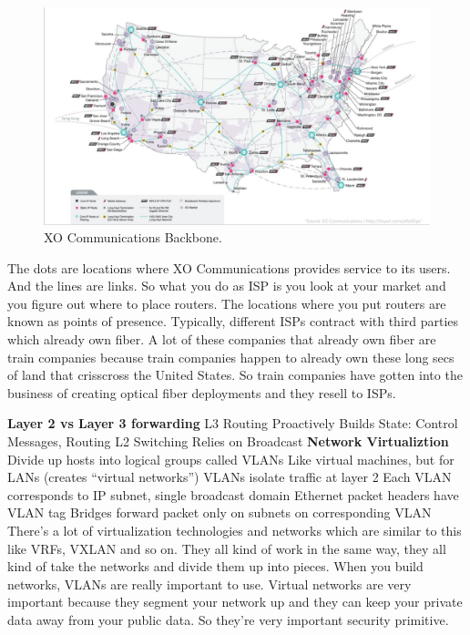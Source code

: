\documentclass[11 pt]{scrartcl}
\begin{document}
    \itemend
\itemend
\begin{figure}[!htb]
    \centering
    \includegraphics[scale=0.5]{assets/xo.png}
    \caption{XO Communications Backbone.}
\end{figure}
\begin{example}
The dots are locations where XO Communications provides service to its users. And the lines are links. So what you do as ISP is you look at your market and you figure out where to place routers. The locations where you put routers are known as points of presence. Typically, different ISPs contract with third parties which already own fiber. A lot of these companies that already own fiber are train companies because train companies happen to already own these long secs of land that crisscross the United States. So train companies have gotten into the business of creating optical fiber deployments and they resell to ISPs.
\end{example}
\textbf{Layer 2 vs Layer 3 forwarding}\newline
L3 Routing Proactively Builds State: Control Messages, Routing \newline
L2 Switching Relies on Broadcast\newline
\textbf{Network Virtualiztion}
\itemnum    
    \ii Divide up hosts into logical groups called VLANs
    \itemnum
        \ii Like virtual machines, but for LANs (creates “virtual networks”)
        \ii VLANs isolate traffic at layer 2
    \itemend
    \ii Each VLAN corresponds to IP subnet, single broadcast domain
    \ii Ethernet packet headers have VLAN tag
    \ii Bridges forward packet only on subnets on corresponding VLAN
\itemend
There's a lot of virtualization technologies and networks which are similar to this like VRFs, VXLAN and so on. They all kind of work in the same way, they all kind of take the networks and divide them up into pieces. When you build networks, VLANs are really important to use. Virtual networks are very important because they segment your network up and they can keep your private data away from your public data. So they're very important security primitive.\newline
\end{document}
